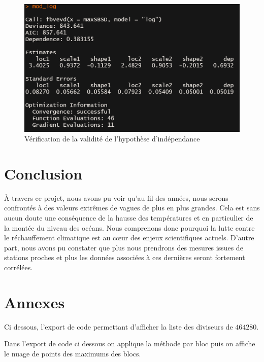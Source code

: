 \documentclass[a4paper,french,10pt]{article}
\begin{document}
\begin{figure}[htp] 
	\centering
	\includegraphics[scale=0.45]{images/dependance_log3.png}
	\caption{Vérification de la validité de l'hypothèse d'indépendance}
	\label{dependance_log3}
\end{figure}

\newpage

\section{Conclusion}
À travers ce projet, nous avons pu voir qu'au fil des années, nous serons confrontés à des valeurs extrêmes de vagues de plus en plus grandes. Cela est sans aucun doute une conséquence de la hausse des températures et en particulier de la montée du niveau des océans. Nous comprenons donc pourquoi la lutte contre le réchauffement climatique est au cœur des enjeux scientifiques actuels. D'autre part, nous avons pu constater que plus nous prendrons des mesures issues de stations proches et plus les données associées à ces dernières seront fortement corrélées. 


\newpage

\section{Annexes}
Ci dessous, l'export de code permettant d'afficher la liste des diviseurs de $464280$.


Dans l'export de code ci dessous on applique la méthode par bloc puis on affiche le nuage de points des maximums des blocs.

\end{document}
